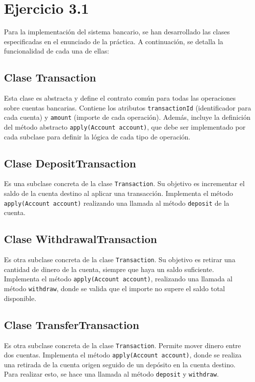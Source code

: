 \documentclass[12pt]{article}
\begin{document}
\section*{Ejercicio 3.1}
Para la implementación del sistema bancario, se han desarrollado las clases especificadas en el enunciado de la práctica. A continuación, se detalla la funcionalidad de cada una de ellas:

\subsection*{Clase Transaction}
Esta clase es abstracta y define el contrato común para todas las operaciones sobre cuentas bancarias. Contiene los atributos \texttt{transactionId} (identificador para cada cuenta) y \texttt{amount} (importe de cada operación). Además, incluye la definición del método abstracto \texttt{apply(Account account)}, que debe ser implementado por cada subclase para definir la lógica de cada tipo de operación.

\subsection*{Clase DepositTransaction}
Es una subclase concreta de la clase \texttt{Transaction}. Su objetivo es incrementar el saldo de la cuenta destino al aplicar una transacción. Implementa el método \texttt{apply(Account account)} realizando una llamada al método \texttt{deposit} de la cuenta.

\subsection*{Clase WithdrawalTransaction}
Es otra subclase concreta de la clase \texttt{Transaction}. Su objetivo es retirar una cantidad de dinero de la cuenta, siempre que haya un saldo suficiente. Implementa el método \texttt{apply(Account account)}, realizando una llamada al método \texttt{withdraw}, donde se valida que el importe no supere el saldo total disponible.

\subsection*{Clase TransferTransaction}
Es otra subclase concreta de la clase \texttt{Transaction}. Permite mover dinero entre dos cuentas. Implementa el método \texttt{apply(Account account)}, donde se realiza una retirada de la cuenta origen seguido de un depósito en la cuenta destino. Para realizar esto, se hace una llamada al método \texttt{deposit} y \texttt{withdraw}.
\end{document}

